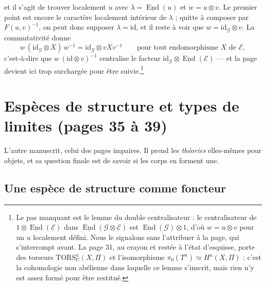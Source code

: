 \documentclass[11pt,a4paper]{article}
\begin{document}
et il s'agit de trouver localement $u$ avec $\lambda =
\underline{\operatorname{End}}(u)$ et $w = u \otimes v$. Le premier point est
encore le caractère localement intérieur de $\lambda$ ; quitte à composer par
$F(u,v)^{-1}$, on peut donc supposer $\lambda = \mathrm{id}$, et il reste à
voir que $w = \mathrm{id}_{\mathcal{G}} \otimes v$. La commutativité donne
\[
w\,(\mathrm{id}_{\mathcal{G}} \otimes X)\,w^{-1}
= \mathrm{id}_{\mathcal{G}} \otimes v X v^{-1}
\qquad \text{pour tout endomorphisme } X \text{ de } \mathcal{E},
\]
c'est-à-dire que $w\,(\mathrm{id} \otimes v)^{-1}$ centralise le facteur
$\mathrm{id}_{\mathcal{G}} \otimes \underline{\operatorname{End}}(\mathcal{E})$
— et la page devient ici trop surchargée pour être suivie.\footnote{Le pas
manquant est le lemme du double centralisateur : le centralisateur de
$1 \otimes \underline{\operatorname{End}}(\mathcal{E})$ dans
$\underline{\operatorname{End}}(\mathcal{G} \otimes \mathcal{E})$ est
$\underline{\operatorname{End}}(\mathcal{G}) \otimes 1$, d'où
$w = u \otimes v$ pour un $u$ localement défini. Nous le signalons sans
l'attribuer à la page, qui s'interrompt avant. La page 31, au crayon et restée
à l'état d'esquisse, porte des torseurs $\mathrm{TORS}^{n}_{U}(X,\Pi)$ et
l'isomorphisme $\pi_{0}(T^{n}) \simeq H^{n}(X,\Pi)$ : c'est la cohomologie non
abélienne dans laquelle ce lemme s'inscrit, mais rien n'y est assez formé pour
être restitué.}


\section*{Espèces de structure et types de limites (pages 35 à 39)}

L'autre manuscrit, celui des pages impaires. Il prend les \emph{théories}
elles-mêmes pour objets, et sa question finale est de savoir si les corps en
forment une.

\subsection*{Une espèce de structure comme foncteur}
\end{document}

